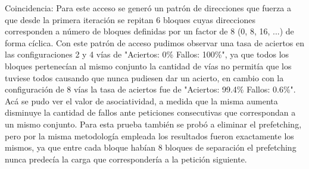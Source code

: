 \documentclass[11pt,letterpaper]{article}
\begin{document}
Coincidencia: Para este acceso se generó un patrón de direcciones que fuerza a que desde la primera iteración se repitan 6 bloques cuyas direcciones corresponden a número de bloques definidas por un factor de 8 (0, 8, 16, ...) de forma cíclica. Con este patrón de acceso pudimos observar una tasa de aciertos en las configuraciones 2 y 4 vías de "Aciertos: 0\% \quad Fallos: 100\%", ya que todos los bloques pertenecían al mismo conjunto la cantidad de vías no permitía que los tuviese todos causando que nunca pudiesen dar un acierto, en cambio con la configuración de 8 vías la tasa de aciertos fue de "Aciertos: 99.4\% \quad Fallos: 0.6\%". Acá se pudo ver el valor de asociatividad, a medida que la misma aumenta disminuye la cantidad de fallos ante peticiones consecutivas que correspondan a un mismo conjunto. Para esta prueba también se probó a eliminar el prefetching, pero por la misma metodología empleada los resultados fueron exactamente los mismos, ya que entre cada bloque habían 8 bloques de separación el prefetching nunca predecía la carga que correspondería a la petición siguiente.
\end{document}
